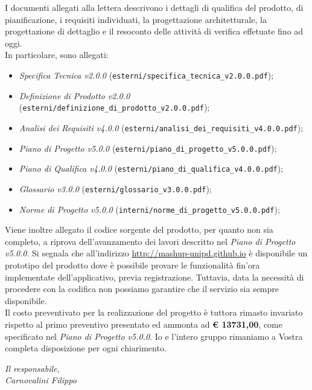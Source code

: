 \documentclass[10pt,a4paper,sans]{moderncv}        %
\begin{document}
\vfill
I documenti allegati alla lettera descrivono i dettagli di qualifica del prodotto, di pianificazione, i requisiti individuati, la progettazione architetturale, la progettazione di dettaglio e il resoconto delle attività di verifica effetuate fino ad oggi.\\ 
\vfill
In particolare, sono allegati:
	\begin{itemize}
		\item \textit{Specifica Tecnica v2.0.0} ({\verb!esterni/specifica_tecnica_v2.0.0.pdf!});
		\item \textit{Definizione di Prodotto v2.0.0} ({\verb!esterni/definizione_di_prodotto_v2.0.0.pdf!});
		\item \textit{Analisi dei Requisiti v4.0.0} ({\verb!esterni/analisi_dei_requisiti_v4.0.0.pdf!});
		\item \textit{Piano di Progetto v5.0.0} ({\verb!esterni/piano_di_progetto_v5.0.0.pdf!});
		\item \textit{Piano di Qualifica v4.0.0} ({\verb!esterni/piano_di_qualifica_v4.0.0.pdf!});
		\item \textit{Glossario v3.0.0} ({\verb!esterni/glossario_v3.0.0.pdf!});
		\item \textit{Norme di Progetto v5.0.0} ({\verb!interni/norme_di_progetto_v5.0.0.pdf!});
	\end{itemize}
\noindent
Viene inoltre allegato il codice sorgente del prodotto, per quanto non sia completo, a riprova dell'avanzamento dei lavori descritto nel \textit{Piano di Progetto v5.0.0}. Si segnala che all'indirizzo {\color{blue}\url{http://mashup-unipd.github.io}} è disponibile un prototipo del prodotto dove è possibile provare le funzionalità fin'ora implementate dell'applicativo, previa registrazione. Tuttavia, data la necessità di procedere con la codifica non possiamo garantire che il servizio sia sempre disponibile.\\ 
\vfill
Il costo preventivato per la realizzazione del progetto è tuttora rimasto invariato rispetto al primo preventivo presentato ed ammonta ad \textbf{\euro{} 13731,00}, come specificato nel \textit{Piano di Progetto v5.0.0}. \newline Io e l'intero gruppo rimaniamo a Vostra completa disposizione per ogni chiarimento.
	\begin{flushright}
		\textit{Il responsabile,}\\ 
		\textit{Carnovalini Filippo}
	\end{flushright}
\end{document}
